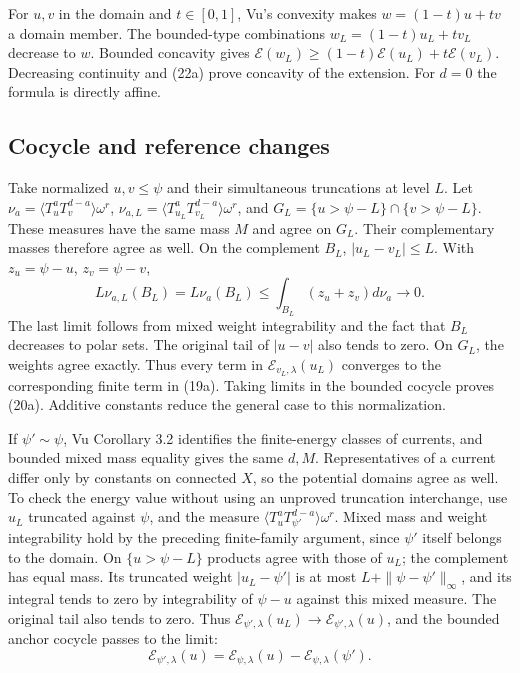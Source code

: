 \documentclass[
  11pt,
]{article}
\begin{document}
For \(u,v\) in the domain and \(t\in[0,1]\), Vu's convexity makes
\(w=(1-t)u+tv\) a domain member. The bounded-type combinations
\(w_L=(1-t)u_L+tv_L\) decrease to \(w\). Bounded concavity gives
\(\mathcal{E}(w_L)\geq(1-t)\mathcal{E}(u_L)+t\mathcal{E}(v_L)\). Decreasing
continuity and (22a) prove concavity of the extension. For \(d=0\) the
formula is directly affine.

\subsection{Cocycle and reference
changes}\label{cocycle-and-reference-changes}

Take normalized \(u,v\leq\psi\) and their simultaneous truncations at
level \(L\). Let \(\nu_a=\langle T_u^aT_v^{d-a}\rangle\omega^r\),
\(\nu_{a,L}=\langle T_{u_L}^aT_{v_L}^{d-a}\rangle\omega^r\), and
\(G_L=\{u>\psi-L\}\cap\{v>\psi-L\}\). These measures have the same mass
\(M\) and agree on \(G_L\). Their complementary masses therefore agree
as well. On the complement \(B_L\), \(|u_L-v_L|\leq L\). With
\(z_u=\psi-u\), \(z_v=\psi-v\), \[
L\nu_{a,L}(B_L)=L\nu_a(B_L)
\leq\int_{B_L}(z_u+z_v)d\nu_a\longrightarrow0.
\] The last limit follows from mixed weight integrability and the fact
that \(B_L\) decreases to polar sets. The original tail of \(|u-v|\)
also tends to zero. On \(G_L\), the weights agree exactly. Thus every
term in \(\mathcal{E}_{v_L,\lambda}(u_L)\) converges to the corresponding
finite term in (19a). Taking limits in the bounded cocycle proves (20a).
Additive constants reduce the general case to this normalization.

If \(\psi'\sim\psi\), Vu Corollary 3.2 identifies the finite-energy
classes of currents, and bounded mixed mass equality gives the same
\(d,M\). Representatives of a current differ only by constants on
connected \(X\), so the potential domains agree as well. To check the
energy value without using an unproved truncation interchange, use
\(u_L\) truncated against \(\psi\), and the measure
\(\langle T_u^aT_{\psi'}^{d-a}\rangle\omega^r\). Mixed mass and weight
integrability hold by the preceding finite-family argument, since
\(\psi'\) itself belongs to the domain. On \(\{u>\psi-L\}\) products
agree with those of \(u_L\); the complement has equal mass. Its
truncated weight \(|u_L-\psi'|\) is at most \(L+\|\psi-\psi'\|_\infty\),
and its integral tends to zero by integrability of \(\psi-u\) against
this mixed measure. The original tail also tends to zero. Thus
\(\mathcal{E}_{\psi',\lambda}(u_L)\to\mathcal{E}_{\psi',\lambda}(u)\), and
the bounded anchor cocycle passes to the limit: \[
\mathcal{E}_{\psi',\lambda}(u)=\mathcal{E}_{\psi,\lambda}(u)-\mathcal{E}_{\psi,\lambda}(\psi').
\]
\end{document}
